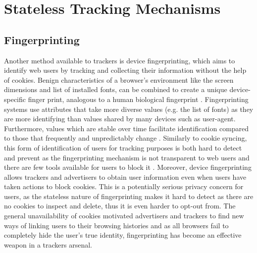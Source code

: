 \documentclass[12pt]{article}
\begin{document}
\section{Stateless Tracking Mechanisms}
    
\subsection{Fingerprinting} \label{fingerprinting}
Another method available to trackers is device fingerprinting, which aims to identify web users by tracking and collecting their information without the help of cookies. Benign characteristics of a browser's environment like the screen dimensions and list of installed fonts, can be combined to create a unique device-specific finger print, analogous to a human biological fingerprint \parencite{uniqueBrowser}. Fingerprinting systems use attributes that take more diverse values (e.g. the list of fonts) as they are more identifying than values shared by many devices such as user-agent. Furthermore, values which are stable over time facilitate identification compared to those that frequently and unpredictably change \parencite{dustingFP}. Similarly to cookie syncing, this form of identification of users for tracking purposes is both hard to detect and prevent as the fingerprinting mechanism is not transparent to web users and there are few tools available for users to block it \parencite{uniqueBrowser}. Moreover, device fingerprinting allows trackers and advertisers to obtain user information even when  users have taken actions to block cookies. This is a potentially serious privacy concern for users, as the stateless nature of fingerprinting makes it hard to detect as there are no cookies to inspect and delete, thus it is even harder to opt-out from. The general unavailability of cookies motivated advertisers and trackers to find new ways of linking users to their browsing histories and as all browsers fail to completely hide the user's true identity, fingerprinting has become an effective weapon in a trackers arsenal. \newline 
\end{document}

